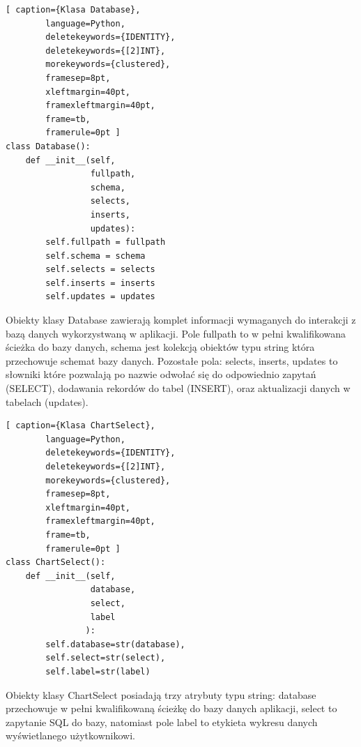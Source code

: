 \documentclass[a4paper,10pt, twoside]{report}
\begin{document}
\begin{minipage}{\textwidth}
    \begin{lstlisting}[ caption={Klasa Database},
        language=Python,
        deletekeywords={IDENTITY},
        deletekeywords={[2]INT},
        morekeywords={clustered},
        framesep=8pt,
        xleftmargin=40pt,
        framexleftmargin=40pt,
        frame=tb,
        framerule=0pt ]
class Database():
    def __init__(self, 
                 fullpath,
                 schema,
                 selects, 
                 inserts,
                 updates):
        self.fullpath = fullpath
        self.schema = schema
        self.selects = selects
        self.inserts = inserts
        self.updates = updates
    \end{lstlisting}
{Obiekty klasy Database zawierają komplet informacji wymaganych do interakcji z
 bazą danych wykorzystwaną w aplikacji. Pole fullpath to w pełni kwalifikowana
 ścieżka do bazy danych, schema jest kolekcją obiektów typu string która 
przechowuje schemat bazy danych. Pozostałe pola: selects, inserts, updates to 
słowniki które pozwalają po nazwie odwołać się do odpowiednio zapytań (SELECT), 
dodawania rekordów do tabel (INSERT), oraz aktualizacji danych w tabelach 
(updates).}
\end{minipage}

\begin{minipage}{\textwidth}
    \begin{lstlisting}[ caption={Klasa ChartSelect},
        language=Python,
        deletekeywords={IDENTITY},
        deletekeywords={[2]INT},
        morekeywords={clustered},
        framesep=8pt,
        xleftmargin=40pt,
        framexleftmargin=40pt,
        frame=tb,
        framerule=0pt ]
class ChartSelect():
    def __init__(self,
                 database,
                 select,
                 label
                ):
        self.database=str(database),
        self.select=str(select),
        self.label=str(label)
    \end{lstlisting}
{Obiekty klasy ChartSelect posiadają trzy atrybuty typu string: database
 przechowuje w pełni kwalifikowaną ścieżkę do bazy danych aplikacji, select 
to zapytanie SQL do bazy, natomiast pole label to etykieta wykresu danych 
wyświetlanego użytkownikowi.}
\end{minipage}
\end{document}
